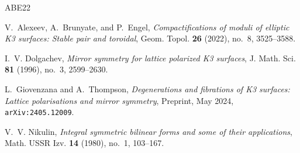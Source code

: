 \documentclass[11pt]{article}
\theoremstyle{remark}
\begin{document}
\begin{thebibliography}{ABE22}

V.~Alexeev, A.~Brunyate, and P.~Engel,
\emph{Compactifications of moduli of elliptic K3 surfaces: Stable pair and toroidal},
Geom. Topol. \textbf{26} (2022), no.~8, 3525--3588.

I.~V. Dolgachev,
\emph{Mirror symmetry for lattice polarized K3 surfaces},
J. Math. Sci. \textbf{81} (1996), no.~3, 2599--2630.

L.~Giovenzana and A.~Thompson,
\emph{Degenerations and fibrations of K3 surfaces: Lattice polarisations and mirror symmetry},
Preprint, May 2024, \texttt{arXiv:2405.12009}.

V.~V. Nikulin,
\emph{Integral symmetric bilinear forms and some of their applications},
Math. USSR Izv. \textbf{14} (1980), no.~1, 103--167.

\end{thebibliography}
\end{document}
